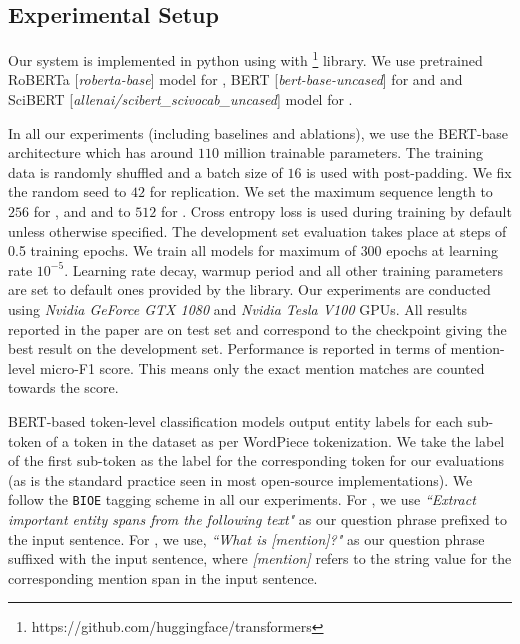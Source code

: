 \subsection{Experimental Setup}
Our system is implemented in python using  with \footnote{https://github.com/huggingface/transformers} library. We use pretrained RoBERTa [\textit{roberta-base}] \cite{liu2019roberta} model for , BERT [\textit{bert-base-uncased}] \cite{devlin2019bert} for  and  and SciBERT [\textit{allenai/scibert\_scivocab\_uncased}] \cite{beltagy-etal-2019-scibert} model for .

In all our experiments (including baselines and ablations), we use the BERT-base architecture which has around $110$ million trainable parameters. The training data is randomly shuffled and a batch size of $16$ is used with post-padding. We fix the random seed to $42$ for replication. We set the maximum sequence length to $256$ for ,  and  and to $512$ for . Cross entropy loss is used during training by default unless otherwise specified. The development set evaluation takes place at steps of 0.5 training epochs. We train all models for maximum of $300$ epochs at learning rate $10^{-5}$. Learning rate decay, warmup period and all other training parameters are set to default ones provided by the  library. Our experiments are conducted using \textit{Nvidia GeForce GTX 1080} and \textit{Nvidia Tesla V100} GPUs. 
All results reported in the paper are on test set and correspond to the checkpoint giving the best result on the development set. Performance is reported in terms of mention-level micro-F1 score. This means only the exact mention matches are counted towards the score.

BERT-based token-level classification models output entity labels for each sub-token of a token in the dataset as per WordPiece tokenization. We take the label of the first sub-token as the label for the corresponding token for our evaluations (as is the standard practice seen in most open-source implementations). We follow the \texttt{BIOE} tagging scheme in all our experiments. For \spandetect{}, we use \textit{``Extract important entity spans from the following text"} as our question phrase prefixed to the input sentence. For \spanclass{}, we use, \textit{``What is [mention]?"} as our question phrase suffixed with the input sentence, where \textit{[mention]} refers to the string value for the corresponding mention span in the input sentence. 

